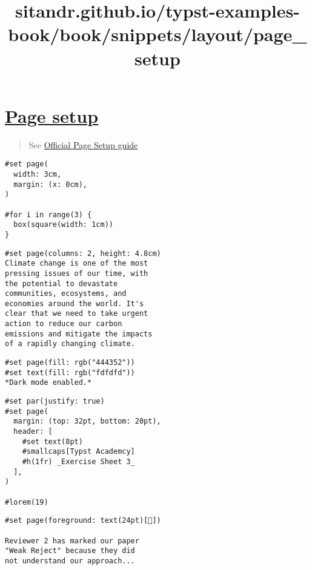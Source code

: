 \title{sitandr.github.io/typst-examples-book/book/snippets/layout/page_setup}

\section{\texorpdfstring{\hyperref[page-setup]{Page
setup}}{Page setup}}\label{page-setup}

\begin{quote}
See \href{https://typst.app/docs/guides/page-setup-guide/}{Official Page
Setup guide}
\end{quote}

\begin{verbatim}
#set page(
  width: 3cm,
  margin: (x: 0cm),
)

#for i in range(3) {
  box(square(width: 1cm))
}
\end{verbatim}

\pandocbounded{}

\begin{verbatim}
#set page(columns: 2, height: 4.8cm)
Climate change is one of the most
pressing issues of our time, with
the potential to devastate
communities, ecosystems, and
economies around the world. It's
clear that we need to take urgent
action to reduce our carbon
emissions and mitigate the impacts
of a rapidly changing climate.
\end{verbatim}

\pandocbounded{}

\begin{verbatim}
#set page(fill: rgb("444352"))
#set text(fill: rgb("fdfdfd"))
*Dark mode enabled.*
\end{verbatim}

\pandocbounded{}

\begin{verbatim}
#set par(justify: true)
#set page(
  margin: (top: 32pt, bottom: 20pt),
  header: [
    #set text(8pt)
    #smallcaps[Typst Academcy]
    #h(1fr) _Exercise Sheet 3_
  ],
)

#lorem(19)
\end{verbatim}

\pandocbounded{}

\begin{verbatim}
#set page(foreground: text(24pt)[🥸])

Reviewer 2 has marked our paper
"Weak Reject" because they did
not understand our approach...
\end{verbatim}

\pandocbounded{}
